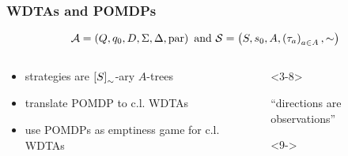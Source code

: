 \documentclass{beamer}
\begin{document}
  \begin{frame}
    \frametitle{\acp{WDTA} and \acp{POMDP}}
    \begin{equation*}
      \mathcal{A} = \left(Q, q_{0}, D, \Sigma, \Delta, \operatorname{par}\right)
      \text{ and }
      \mathcal{S} = \left(S, s_{0}, A, \left(\tau_{a}\right)_{a\in A}, \sim\right)
    \end{equation*}
    \begin{overlayarea}{\textwidth}{0.8\textheight}
      \begin{columns}
        \begin{column}{0.35\textwidth}
          \begin{itemize}
            \item<2-> strategies are
              $\left[S\right]_{\sim}$-ary $A$-trees
            \item<3-> translate \acs{POMDP} to c.l. \acp{WDTA}
            \item<9-> use \acp{POMDP} as emptiness game for c.l. \acp{WDTA}
          \end{itemize}
        \end{column}
        \begin{column}{0.65\textwidth}
          \begin{onlyenv}<3-8>
            \begin{center}
              \enquote{directions are observations}
            \end{center}
          \end{onlyenv}
          \begin{onlyenv}<9->
            \begin{center}

\end{center}
\end{onlyenv}
\end{column}
\end{columns}
\end{overlayarea}
\end{frame}
\end{document}
